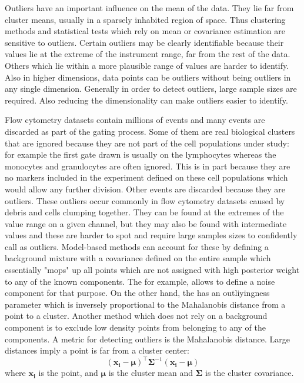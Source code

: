 Outliers have an important influence on the mean of the data.
They lie far from cluster means, usually in a sparsely inhabited region of space.
Thus clustering methods and statistical tests which rely on mean or covariance estimation are sensitive to outliers.
Certain outliers may be clearly identifiable because their values lie at the extreme of the instrument range, far from the rest of the data.
Others which lie within a more plausible range of values are harder to identify.
Also in higher dimensions, data points can be outliers without being outliers in any single dimension.
Generally in order to detect outliers, large sample sizes are required.
Also reducing the dimensionality can make outliers easier to identify.

Flow cytometry datasets contain millions of events and many events are discarded as part of the gating process.
Some of them are real biological clusters that are ignored because they are not part of the cell populations under study:
for example the first gate drawn is usually on the lymphocytes whereas the monocytes and granulocytes are often ignored.
This is in part because they are no markers included in the experiment defined on these cell populations which would allow any further division.
Other events are discarded because they are outliers. These outliers occur commonly in flow cytometry datasets caused by debris and cells clumping together.
They can be found at the extremes of the value range on a given channel, but they may also be found with intermediate values and these are harder to spot and require large samples sizes to confidently call as outliers.
Model-based methods can account for these by defining a background mixture with a covariance defined on the entire sample which essentially "mops" up all points
which are not assigned with high posterior weight to any of the known components.
The  for example, allows to define a noise component for that purpose.
On the other hand, the  has an outliyingness parameter which is inversely proportional to the Mahalanobis distance from a point to a cluster.
Another method which does not rely on a background component is to exclude low density points from belonging to any of the components.
A metric for detecting outliers is the Mahalanobis distance.  Large distances imply a point is far from a cluster center:
\[
(\boldsymbol{x_i}-\boldsymbol{\mu})^{\top}\boldsymbol{\Sigma}^{-1}(\boldsymbol{x_i}-\boldsymbol{\mu})
\]
where $\boldsymbol{x_i}$ is the point, and $\boldsymbol{\mu}$ is the cluster mean and $\boldsymbol{\Sigma}$ is the cluster covariance.

